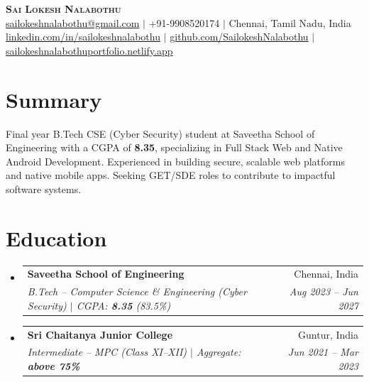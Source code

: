 \documentclass[letterpaper,10pt]{article}
\makeatletter
\newcommand{\resumeSubheading}[4]{
  \vspace{-2pt}\item
    \begin{tabular*}{0.97\textwidth}[t]{@{}l@{\extracolsep{\fill}}r@{}}
      \textbf{#1} & \small #2 \\
      \textit{\small#3} & \textit{\small #4} \\
    \end{tabular*}\vspace{-6pt}
}
\newcommand{\resumeSubHeadingListStart}{\begin{itemize}[leftmargin=0.15in, label={}]}
\newcommand{\resumeSubHeadingListEnd}{\end{itemize}}
\makeatother
\begin{document}
\begin{center}
    {\Huge \scshape \textbf{Sai Lokesh Nalabothu}} \\ \vspace{4pt}
    \small
    \href{mailto:sailokeshnalabothu@gmail.com}{sailokeshnalabothu@gmail.com}
    \hspace{2pt}$|$\hspace{2pt}
    +91-9908520174
    \hspace{2pt}$|$\hspace{2pt}
    Chennai, Tamil Nadu, India \\ \vspace{2pt}
    \href{https://linkedin.com/in/sailokeshnalabothu}{linkedin.com/in/sailokeshnalabothu}
    \hspace{2pt}$|$\hspace{2pt}
    \href{https://github.com/SailokeshNalabothu}{github.com/SailokeshNalabothu}
    \hspace{2pt}$|$\hspace{2pt}
    \href{https://sailokeshnalabothuportfolio.netlify.app}{sailokeshnalabothuportfolio.netlify.app}
\end{center}

\vspace{-8pt}

\section{Summary}
\vspace{2pt}
\small{
Final year B.Tech CSE (Cyber Security) student at Saveetha School of Engineering with a CGPA of \textbf{8.35}, specializing in Full Stack Web and Native Android Development. Experienced in building secure, scalable web platforms and native mobile apps. Seeking GET/SDE roles to contribute to impactful software systems.
}

\vspace{-2pt}

\section{Education}
  \resumeSubHeadingListStart
    \resumeSubheading
      {Saveetha School of Engineering}{Chennai, India}
      {B.Tech -- Computer Science \& Engineering (Cyber Security) $|$ CGPA: \textbf{8.35} (83.5\%)}{Aug 2023 -- Jun 2027}
    \resumeSubheading
      {Sri Chaitanya Junior College}{Guntur, India}
      {Intermediate -- MPC (Class XI--XII) $|$ Aggregate: \textbf{above 75\%}}{Jun 2021 -- Mar 2023}
  \resumeSubHeadingListEnd
\end{document}
